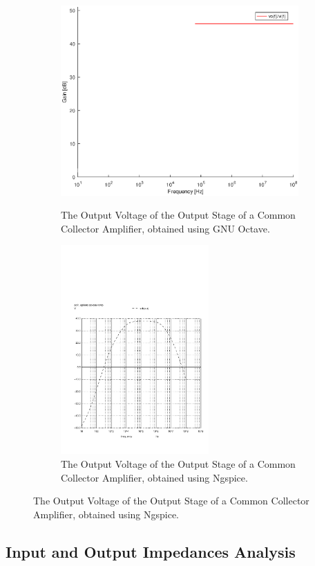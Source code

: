 \begin{figure}[H]
\begin{subfigure}{0.5\textwidth}
\includegraphics[width=0.9\linewidth, height=8cm]{gain.eps} 
\caption{The Output Voltage of the Output Stage of a Common Collector Amplifier, obtained using GNU Octave.}
\label{fig:theo_third}
\end{subfigure}
\begin{subfigure}{0.5\textwidth}
\includegraphics[width=0.8\linewidth, height=8cm]{vo2f.pdf}
\caption{The Output Voltage of the Output Stage of a Common Collector Amplifier, obtained using Ngspice.}
\label{fig:total}
\end{subfigure}
\end{figure}


\subsection{Input and Output Impedances Analysis}
\label{subsec:freqresp}

